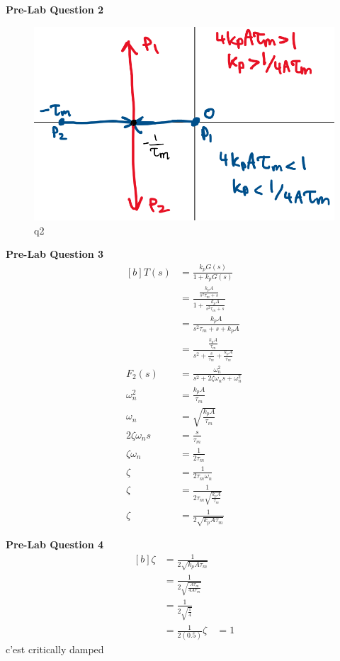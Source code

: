 \documentclass[12pt]{article}
\begin{document}
\textbf{Pre-Lab Question 2}
\begin{figure}
    \centering
    \includegraphics[width=\textwidth]{q2}
    \caption{\label{fig:2}q2}
\end{figure}

\textbf{Pre-Lab Question 3}
\begin{equation*}
\begin{aligned}[b]
    T(s) &= \frac{k_pG(s)}{1 + k_pG(s)} \\
    &= \frac{\frac{k_pA}{s^2\tau_m + s}}{1 + \frac{k_pA}{s^2\tau_m + s}} \\
    &= \frac{k_pA}{s^2\tau_m + s + k_pA} \\
    &= \frac{\frac{k_pA}{\tau_m}}{s^2 + \frac{s}{\tau_m} + \frac{k_pA}{\tau_m}} \\
    F_2(s) &= \frac{\omega_n^2}{s^2 + 2\zeta\omega_ns + \omega_n^2} \\
    \omega_n^2 &= \frac{k_pA}{\tau_m} \\
    \omega_n &= \sqrt{\frac{k_pA}{\tau_m}} \\
    2\zeta\omega_ns &= \frac{s}{\tau_m} \\
    \zeta\omega_n &= \frac{1}{2\tau_m} \\
    \zeta &= \frac{1}{2\tau_m\omega_n} \\
    \zeta &= \frac{1}{2\tau_m\sqrt{\frac{k_pA}{\tau_m}}} \\
    \zeta &= \frac{1}{2\sqrt{k_pA\tau_m}}
\end{aligned}
\end{equation*}

\textbf{Pre-Lab Question 4}
\begin{equation*}
\begin{aligned}[b]
    \zeta &= \frac{1}{2\sqrt{k_pA\tau_m}} \\
    &= \frac{1}{2\sqrt{\frac{A\tau_m}{4A\tau_m}}} \\
    &= \frac{1}{2\sqrt{\frac{1}{4}}} \\
    &= \frac{1}{2(0.5)}
    \zeta &= 1
\end{aligned}
\end{equation*}
c'est critically damped
\end{document}

